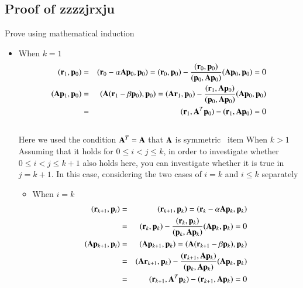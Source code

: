 \subsection{Proof of zzzzjrxju}


Prove using mathematical induction

\begin{itemize}

\item When $k=1$ \\
\begin{eqnarray}
(\mathbf{r}_1,\mathbf{p}_0)
&=&  (\mathbf{r}_0-\alpha\mathbf{A}\mathbf{p}_0,\mathbf{p}_0) = (\mathbf{r}_0,\mathbf{p}_0)-\frac{(\mathbf{r}_0,\mathbf{p}_0)}{(\mathbf{p}_0,\mathbf{A}\mathbf{p}_0)}(\mathbf{A}\mathbf{p}_0,\mathbf{p}_0)  =  0 \\
(\mathbf{A}\mathbf{p}_1,\mathbf{p}_0)
&=& (\mathbf{A}(\mathbf{r}_1-\beta\mathbf{p}_0),\mathbf{p}_0) = (\mathbf{A}\mathbf{r}_1,\mathbf{p}_0)-\frac{(\mathbf{r}_1,\mathbf{A}\mathbf{p}_0)}{(\mathbf{p}_0,\mathbf{A}\mathbf{p}_0)}(\mathbf{A}\mathbf{p}_0,\mathbf{p}_0) \\
&=& (\mathbf{r}_1,\mathbf{A}^T\mathbf{p}_0)-(\mathbf{r}_1,\mathbf{A}\mathbf{p}_0)=0
\end{eqnarray}\\
Here we used the condition $\mathbf{A}^T=\mathbf{A}$ that $\mathbf{A}$ is symmetric
\ item When $k>1$ \\
Assuming that it holds for $0\le{i}<{j}\le{k}$, in order to investigate whether $0\le{i}<{j}\le{k+1}$ also holds here, you can investigate whether it is true in $j=k+1$. In this case, considering the two cases of $i=k$ and $i\le{k}$ separately
\begin {itemize}
\item When $i=k$ \ \
\begin{eqnarray}
(\mathbf{r}_{k+1},\mathbf{p}_i)
&=&  (\mathbf{r}_{k+1},\mathbf{p}_k)  =  (\mathbf{r}_k-\alpha\mathbf{A}\mathbf{p}_k,\mathbf{p}_k) \\
&=& (\mathbf{r}_k,\mathbf{p}_k)-\frac{(\mathbf{r}_k,\mathbf{p}_k)}{(\mathbf{p}_k,\mathbf{A}\mathbf{p}_k)}(\mathbf{A}\mathbf{p}_k,\mathbf{p}_k)=0\\
(\mathbf{A}\mathbf{p}_{k+1},\mathbf{p}_i)
&=& (\mathbf{A}\mathbf{p}_{k+1},\mathbf{p}_k) = (\mathbf{A}(\mathbf{r}_{k+1}-\beta\mathbf{p}_k),\mathbf{p}_k) \\
&=& (\mathbf{A}\mathbf{r}_{k+1},\mathbf{p}_k)-\frac{(\mathbf{r}_{k+1},\mathbf{A}\mathbf{p}_k)}{(\mathbf{p}_k,\mathbf{A}\mathbf{p}_k)}(\mathbf{A}\mathbf{p}_k,\mathbf{p}_k) \\
&=& (\mathbf{r}_{k+1},\mathbf{A}^T\mathbf{p}_k)-(\mathbf{r}_{k+1},\mathbf{A}\mathbf{p}_k)=0
\end{eqnarray}


\end{itemize}
\end{itemize}
